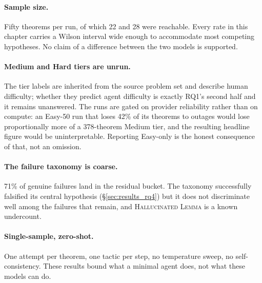 \paragraph{Sample size.}
Fifty theorems per run, of which 22 and 28 were reachable. Every rate in this
chapter carries a Wilson interval wide enough to accommodate most competing
hypotheses. No claim of a difference between the two models is supported.

\paragraph{Medium and Hard tiers are unrun.}
The tier labels are inherited from the source problem set and describe human
difficulty; whether they predict agent difficulty is exactly RQ1's second half
and it remains unanswered. The runs are gated on provider reliability rather than
on compute: an Easy-50 run that loses 42\% of its theorems to outages would lose
proportionally more of a 378-theorem Medium tier, and the resulting headline
figure would be uninterpretable. Reporting Easy-only is the honest consequence of
that, not an omission.

\paragraph{The failure taxonomy is coarse.}
71\% of genuine failures land in the residual bucket. The taxonomy successfully
falsified its central hypothesis (\S\ref{sec:results_rq4}) but it does not
discriminate well among the failures that remain, and
\textsc{Hallucinated Lemma} is a known undercount.

\paragraph{Single-sample, zero-shot.}
One attempt per theorem, one tactic per step, no temperature sweep, no
self-consistency. These results bound what a minimal agent does, not what these
models can do.
